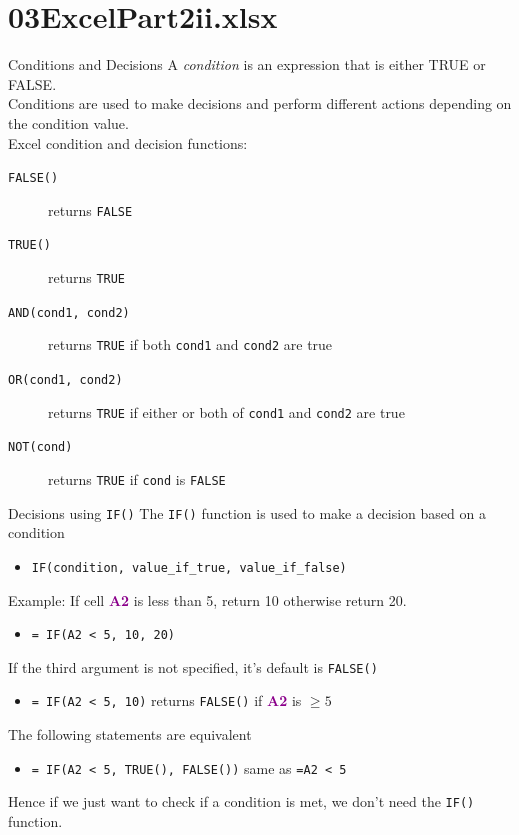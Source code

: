 \documentclass[xcolor=svgnames]{beamer}
\newcommand{\cell}[1]{{\sf \textbf{\textcolor{DarkMagenta}{#1}}}}
\begin{document}
\section
  {03ExcelPart2ii.xlsx}


\begin{frame}{Conditions and Decisions}
A \emph{condition} is an expression that is either TRUE or FALSE.\\[1em]
Conditions are used to make decisions and perform different actions depending on the condition value.\\[1em]

Excel condition and decision functions:
\begin{description}
\item[{\tt FALSE()}]  returns {\tt FALSE}
\item[{\tt TRUE()}] returns {\tt TRUE}
\item[{\tt AND(cond1, cond2)}] returns {\tt TRUE} if both {\tt cond1} and {\tt cond2} are true
\item[{\tt OR(cond1, cond2)}] returns {\tt TRUE} if either or both of {\tt cond1} and {\tt cond2} are true
\item[{\tt NOT(cond)}] returns {\tt TRUE} if {\tt cond} is {\tt FALSE}
\end{description}
\end{frame}

\begin{frame}[fragile]{Decisions using {\tt IF()}}
 The {\tt IF()} function is used to make a decision based on a condition
\begin{itemize}
\item \verb|IF(condition, value_if_true, value_if_false)|
\end{itemize}
\medskip
 Example: If cell \cell{A2} is less than 5, return 10 otherwise return 20.
\begin{itemize}
\item \verb|= IF(A2 < 5, 10, 20)|
\end{itemize}
\medskip
If the third argument is not specified, it's default  is {\tt FALSE()}
\begin{itemize}
\item \verb|= IF(A2 < 5, 10)| returns {\tt FALSE()} if \cell{A2} is $\geq 5$
\end{itemize}
\medskip
The following statements are equivalent
\begin{itemize}
\item \verb|= IF(A2 < 5, TRUE(), FALSE())| same as \verb|=A2 < 5|
\end{itemize}
Hence if we just want to check if a condition is met, we don't need the {\tt IF()} function.

\end{frame}
\end{document}
